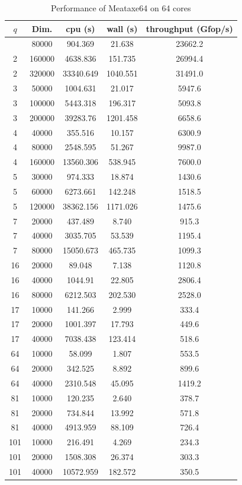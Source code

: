 \documentclass{deliverablereport}
\begin{document}
\begin{small}
\begin{center}
  \begin{longtable}{|c|c|c|c|c|}
    \caption[]{Performance of Meataxe64 on 64 cores}\label{fig:matmult:par}\\
    \hline
    $q$&Dim.&cpu (s)&wall (s) &throughput (Gfop/s)\\
    \hline
    \endhead
    \hline
    \endfoot
2&80000&904.369&21.638&23662.2\\
2&160000&4638.836&151.735&26994.4\\
2&320000&33340.649&1040.551&31491.0\\
3&50000&1004.631&21.017&5947.6\\
3&100000&5443.318&196.317&5093.8\\
3&200000&39283.76&1201.458&6658.6\\
4&40000&355.516&10.157&6300.9\\
4&80000&2548.595&51.267&9987.0\\
4&160000&13560.306&538.945&7600.0\\
5&30000&974.333&18.874&1430.6\\
5&60000&6273.661&142.248&1518.5\\
5&120000&38362.156&1171.026&1475.6\\
7&20000&437.489&8.740&915.3\\
7&40000&3035.705&53.539&1195.4\\
7&80000&15050.673&465.735&1099.3\\
16&20000&89.048&7.138&1120.8\\
16&40000&1044.91&22.805&2806.4\\
16&80000&6212.503&202.530&2528.0\\
17&10000&141.266&2.999&333.4\\
17&20000&1001.397&17.793&449.6\\
17&40000&7038.438&123.414&518.6\\
64&10000&58.099&1.807&553.5\\
64&20000&342.525&8.892&899.6\\
64&40000&2310.548&45.095&1419.2\\
81&10000&120.235&2.640&378.7\\
81&20000&734.844&13.992&571.8\\
81&40000&4913.959&88.109&726.4\\
101&10000&216.491&4.269&234.3\\
101&20000&1508.308&26.374&303.3\\
101&40000&10572.959&182.572&350.5\\
  \end{longtable}
\end{center}
\end{small}
\end{document}
